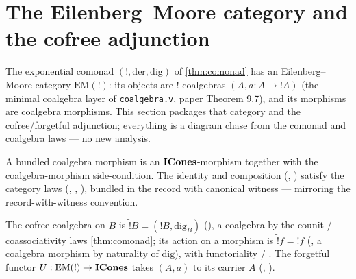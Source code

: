 \section{The Eilenberg--Moore category and the cofree adjunction}%
\label{sec:cbv-em}

The exponential comonad $(\mathord{!}, \mathrm{der}, \mathrm{dig})$ of
\autoref{thm:comonad} has an Eilenberg--Moore category
$\mathrm{EM}(\mathord{!})$: its objects are $\mathord{!}$-coalgebras
$(A, a : A \to \mathord{!}A)$ (the minimal coalgebra layer of
\texttt{coalgebra.v}, paper Theorem 9.7), and its morphisms are coalgebra
morphisms. This section packages that category and the cofree/forgetful
adjunction; everything is a diagram chase from the comonad and coalgebra
laws --- no new analysis.

\begin{definition}%
\label{def:cbv-em-cat}
\rocqok
{}\rocqok
{}\rocqok
{}
A bundled coalgebra morphism  is an
$\mathbf{ICones}$-morphism together with the coalgebra-morphism side-condition.
The identity and composition (,
) satisfy the category laws
(,
,
), bundled in the record
 with canonical witness
 --- mirroring the
 record-with-witness convention.
\end{definition}

\begin{definition}\label{def:cbv-cofree}
\rocqok
{}\rocqok
{}
The cofree coalgebra on $B$ is
$\widetilde{\mathord{!}}B = (\mathord{!}B, \mathrm{dig}_B)$
(), a coalgebra by the counit /
coassociativity laws \autoref{thm:comonad}; its action on a morphism is
$\widetilde{\mathord{!}}f = \mathord{!}f$
(, a coalgebra morphism by
naturality of $\mathrm{dig}$), with functoriality
 /
. The forgetful functor
$U : \mathrm{EM}(\mathord{!}) \to \mathbf{ICones}$ takes $(A, a)$ to its carrier
$A$ (, ).
\end{definition}


